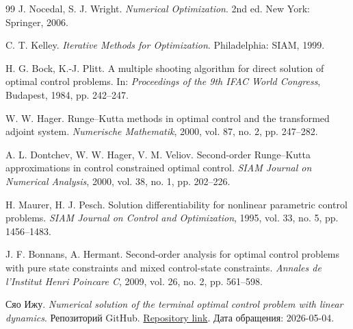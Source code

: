 \documentclass[a4paper,12pt]{article}
\begin{document}
{\begin{thebibliography}{99}
J. Nocedal, S. J. Wright.
\newblock \emph{Numerical Optimization}. 2nd ed.
\newblock New York: Springer, 2006.

C. T. Kelley.
\newblock \emph{Iterative Methods for Optimization}.
\newblock Philadelphia: SIAM, 1999.

H. G. Bock, K.-J. Plitt.
\newblock A multiple shooting algorithm for direct solution of optimal control problems.
\newblock In: \emph{Proceedings of the 9th IFAC World Congress}, Budapest, 1984, pp. 242--247.

W. W. Hager.
\newblock Runge--Kutta methods in optimal control and the transformed adjoint system.
\newblock \emph{Numerische Mathematik}, 2000, vol. 87, no. 2, pp. 247--282.

A. L. Dontchev, W. W. Hager, V. M. Veliov.
\newblock Second-order Runge--Kutta approximations in control constrained optimal control.
\newblock \emph{SIAM Journal on Numerical Analysis}, 2000, vol. 38, no. 1, pp. 202--226.

H. Maurer, H. J. Pesch.
\newblock Solution differentiability for nonlinear parametric control problems.
\newblock \emph{SIAM Journal on Control and Optimization}, 1995, vol. 33, no. 5, pp. 1456--1483.

J. F. Bonnans, A. Hermant.
\newblock Second-order analysis for optimal control problems with pure state constraints and mixed control-state constraints.
\newblock \emph{Annales de l'Institut Henri Poincare C}, 2009, vol. 26, no. 2, pp. 561--598.

Сяо Ижу.
\newblock \emph{Numerical solution of the terminal optimal control problem with linear dynamics}.
\newblock Репозиторий GitHub.
\newblock \href{https://github.com/yxforever666gh/Numerical-solution-of-the-terminal-optimal-control-problem-with-linear-dynamics.git}{Repository link}.
\newblock Дата обращения: 2026-05-04.
\end{thebibliography}
\fussy
}
\end{document}

